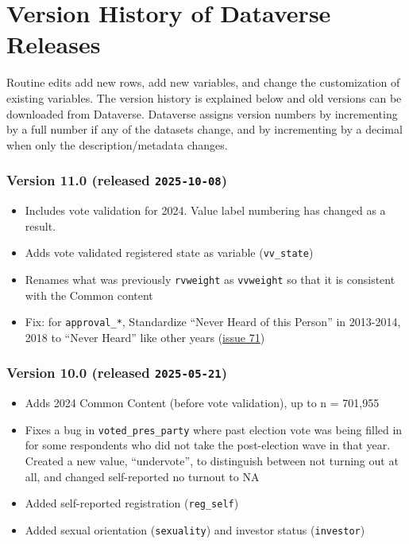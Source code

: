 \documentclass[10pt,article,oneside]{memoir}
\begin{document}
\newpage

\section{Version History of Dataverse
Releases}\label{version-history-of-dataverse-releases}

Routine edits add new rows, add new variables, and change the
customization of existing variables. The version history is explained
below and old versions can be downloaded from Dataverse. Dataverse
assigns version numbers by incrementing by a full number if any of the
datasets change, and by incrementing by a decimal when only the
description/metadata changes.

\subsubsection{\texorpdfstring{Version 11.0 (released
\texttt{2025-10-08})}{Version 11.0 (released 2025-10-08)}}\label{version-11.0-released-2025-10-08}

\begin{itemize}
\tightlist
\item
  Includes vote validation for 2024. Value label numbering has changed
  as a result.
\item
  Adds vote validated registered state as variable (\texttt{vv\_state})
\item
  Renames what was previously \texttt{rvweight} as \texttt{vvweight} so
  that it is consistent with the Common content
\item
  Fix: for \texttt{approval\_*}, Standardize ``Never Heard of this
  Person'' in 2013-2014, 2018 to ``Never Heard'' like other years
  (\href{https://github.com/kuriwaki/cces_cumulative/issues/71}{issue
  71})
\end{itemize}

\subsubsection{\texorpdfstring{Version 10.0 (released
\texttt{2025-05-21})}{Version 10.0 (released 2025-05-21)}}\label{version-10.0-released-2025-05-21}

\begin{itemize}
\tightlist
\item
  Adds 2024 Common Content (before vote validation), up to n = 701,955
\item
  Fixes a bug in \texttt{voted\_pres\_party} where past election vote
  was being filled in for some respondents who did not take the
  post-election wave in that year. Created a new value, ``undervote'',
  to distinguish between not turning out at all, and changed
  self-reported no turnout to NA
\item
  Added self-reported registration (\texttt{reg\_self})
\item
  Added sexual orientation (\texttt{sexuality}) and investor status
  (\texttt{investor})
\end{itemize}
\end{document}

